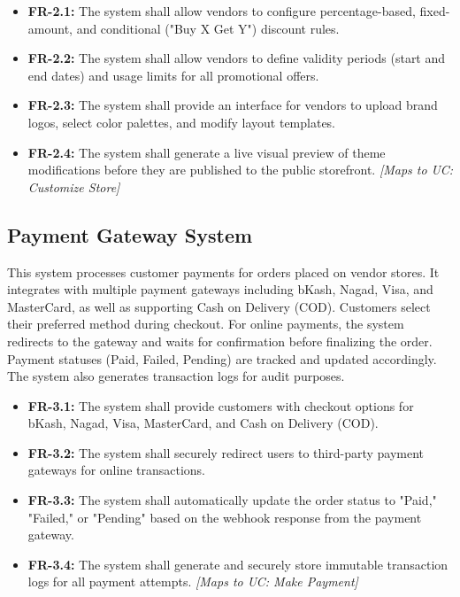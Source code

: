 \begin{itemize}
    \item \textbf{FR-2.1:} The system shall allow vendors to configure percentage-based, fixed-amount, and conditional ("Buy X Get Y") discount rules.
    \item \textbf{FR-2.2:} The system shall allow vendors to define validity periods (start and end dates) and usage limits for all promotional offers.
    \item \textbf{FR-2.3:} The system shall provide an interface for vendors to upload brand logos, select color palettes, and modify layout templates.
    \item \textbf{FR-2.4:} The system shall generate a live visual preview of theme modifications before they are published to the public storefront. \textit{[Maps to UC: Customize Store]}
\end{itemize}

\subsection{Payment Gateway System}
This system processes customer payments for orders placed on vendor stores. It integrates with multiple payment gateways including bKash, Nagad, Visa, and MasterCard, as well as supporting Cash on Delivery (COD). Customers select their preferred method during checkout. For online payments, the system redirects to the gateway and waits for confirmation before finalizing the order. Payment statuses (Paid, Failed, Pending) are tracked and updated accordingly. The system also generates transaction logs for audit purposes.

\begin{itemize}
    \item \textbf{FR-3.1:} The system shall provide customers with checkout options for bKash, Nagad, Visa, MasterCard, and Cash on Delivery (COD).
    \item \textbf{FR-3.2:} The system shall securely redirect users to third-party payment gateways for online transactions.
    \item \textbf{FR-3.3:} The system shall automatically update the order status to "Paid," "Failed," or "Pending" based on the webhook response from the payment gateway.
    \item \textbf{FR-3.4:} The system shall generate and securely store immutable transaction logs for all payment attempts. \textit{[Maps to UC: Make Payment]}
\end{itemize}

